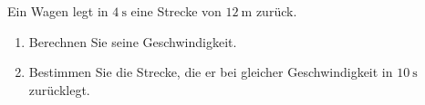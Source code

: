\begin{ExerciseBlock}
Ein Wagen legt in \(\qty{4}{\second}\) eine Strecke von \(\qty{12}{\metre}\) zurück.
\begin{enumerate}
\item Berechnen Sie seine Geschwindigkeit.
\item Bestimmen Sie die Strecke, die er bei gleicher Geschwindigkeit in \(\qty{10}{\second}\) zurücklegt.
\end{enumerate}
\end{ExerciseBlock}
